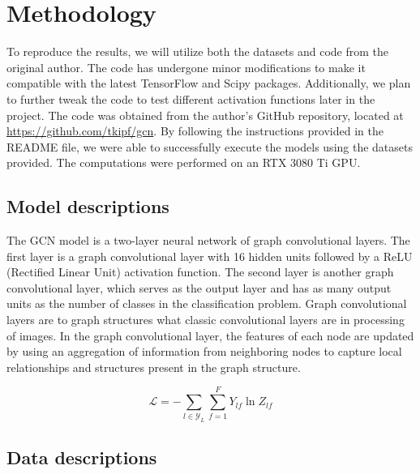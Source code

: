 \documentclass[11pt,a4paper]{article}
\begin{document}
\section{Methodology}


To reproduce the results, we will utilize both the datasets and code from the original author. The code has undergone minor modifications to make it compatible with the latest TensorFlow and Scipy packages. Additionally, we plan to further tweak the code to test different activation functions later in the project. The code was obtained from the author's GitHub repository, located at \url{https://github.com/tkipf/gcn}. By following the instructions provided in the README file, we were able to successfully execute the models using the datasets provided. The computations were performed on an RTX 3080 Ti GPU.

\subsection{Model descriptions}

The GCN model is a two-layer neural network of graph convolutional layers. The first layer is a graph convolutional layer with 16 hidden units followed by a ReLU (Rectified Linear Unit) activation function. The second layer is another graph convolutional layer, which serves as the output layer and has as many output units as the number of classes in the classification problem. Graph convolutional layers are to graph structures what classic convolutional layers are in processing of images. In the graph convolutional layer, the features of each node are updated by using an aggregation of information from neighboring nodes to capture local relationships and structures present in the graph structure.

\begin{equation}
  \mathcal{L} = -\sum_{l\in \mathcal{Y}_L}\sum_{f=1}^{F} Y_{lf}\ln Z_{lf}
\end{equation}

\subsection{Data descriptions}
\end{document}

